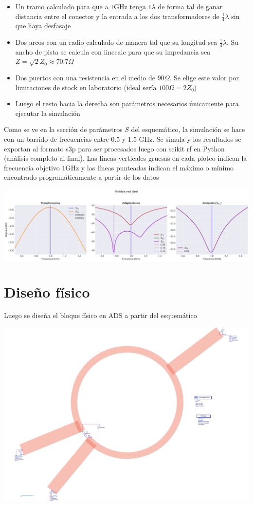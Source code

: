 \documentclass[a4paper, 12pt]{article}
\begin{document}
\begin{itemize}
    \item Un tramo calculado para que a $1\text{GHz}$ tenga $1\lambda$ de forma tal de ganar distancia entre el conector y la entrada a los dos transformadores de $\frac{1}{4}\lambda$ sin que haya desfasaje
    \item Dos arcos con un radio calculado de manera tal que su longitud sea $\frac{1}{4}\lambda$. Su ancho de pista se calcula con linecalc para que su impedancia sea $Z = \sqrt{2}Z_0 \approx 70.7\Omega$
    \item Dos puertos con una resistencia en el medio de $90\Omega$. Se elige este valor por limitaciones de stock en laboratorio (ideal sería $100\Omega = 2Z_0$)
    \item Luego el resto hacia la derecha son parámetros necesarios únicamente para ejecutar la simulación
\end{itemize}
Como se ve en la sección de parámetros $S$ del esquemático, la simulación se hace con un barrido de frecuencias entre $0.5$ y $1.5 \text{ GHz}$. Se simula y los resultados se exportan al formato s3p para ser procesados luego con scikit rf en Python (análisis completo al final).
Las líneas verticales gruesas en cada ploteo indican la frecuencia objetivo $1\text{GHz}$ y las líneas punteadas indican el máximo o mínimo encontrado programáticamente a partir de los datos

\includegraphics[width=0.9\linewidth]{./img/plot-ideal.png}

\section*{Diseño físico}
Luego se diseña el bloque físico en ADS a partir del esquemático

\includegraphics[width=0.6\linewidth]{./img/simulado.jpg}
\end{document}
